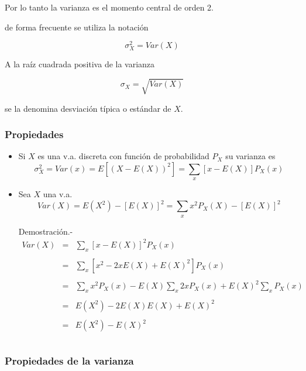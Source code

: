 \documentclass[
]{article}
\begin{document}
Por lo tanto la varianza es el momento central de orden 2.

de forma frecuente se utiliza la notación

\[\sigma_X^2 = Var(X)\]

A la raíz cuadrada positiva de la varianza

\[\sigma_X = \sqrt{Var(X)}\]

se la denomina desviación típica o estándar de \(X\).

\hypertarget{propiedades}{%
\subsubsection{Propiedades}\label{propiedades}}

\begin{itemize}
  \item Si $X$ es una v.a. discreta con función de probabilidad $P_X$ su varianza es
  $$\sigma_X^2 = Var(x) = E\left[(X-E(X))^2\right] = \sum_{x} \left[x-E(X)\right]P_X(x)$$
 
  \item Sea $X$ una v.a. 
  $$Var(X) = E(X^2) -\left[E(X)\right]^2 = \sum_{x} x^2 P_X(X) - \left[E(X)\right]^2$$
  
 Demostración.- 
 $$\begin{array}{rcl}
  Var(X)&=&\sum\limits_{x}\left[x-E(X)\right]^2P_X(x)\\\\
  &=&\sum\limits_{x}\left[x^2 - 2xE(X) + E(X)^2\right]P_X(x)\\\\
  &=&\sum\limits_{x} x^2P_X(x) - E(X)\sum\limits_{x}2xP_X(x) + E(X)^2 \sum\limits_{x}P_X(x)\\\\
  &=&E(X^2) - 2E(X)E(X) + E(X)^2\\\\
  &=&E(X^2) - E(X)^2\\\\
 \end{array}$$
 
\end{itemize}

\hypertarget{propiedades-de-la-varianza}{%
\subsubsection{Propiedades de la
varianza}\label{propiedades-de-la-varianza}}
\end{document}
